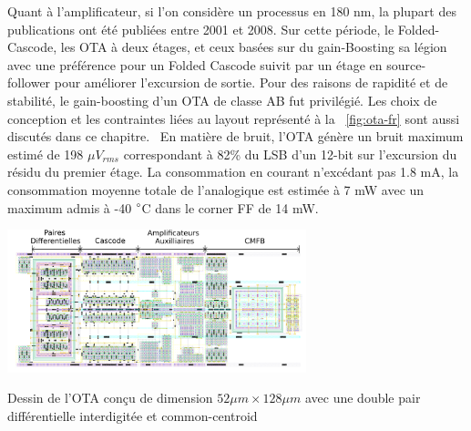\begin{mdframed}[linecolor=Prune,linewidth=1]
Quant à l'amplificateur, si l'on considère un processus en 180 nm, la plupart des publications ont été publiées entre 2001 et 2008. Sur cette période, le Folded-Cascode, les OTA à deux étages, et ceux basées sur du gain-Boosting sa légion avec une préférence pour un Folded Cascode suivit par un étage en source-follower pour améliorer l'excursion de sortie. Pour des raisons de rapidité et de stabilité, le gain-boosting d'un OTA de classe AB fut privilégié. Les choix de conception et les contraintes liées au layout représenté à la \figurename~\ref{fig:ota-fr} sont aussi discutés dans ce chapitre.  En matière de bruit, l'OTA génère un bruit maximum estimé de 198 \(\mu V _{rms} \) correspondant à 82\% du LSB d'un 12-bit sur l'excursion du résidu du premier étage. La consommation en courant n'excédant pas 1.8 mA, la consommation moyenne totale de l'analogique est estimée à 7 mW avec un maximum admis à -40 $\degree$C dans le corner FF de 14 mW.

\begin{center}
    \centering
    \includegraphics[width=0.65\textwidth]{Chapter7/Figs/layout_ota_v2-fr.png}
    \caption[]{Dessin de l'OTA conçu de dimension \(52 \mu m \times 128 \mu m\) avec une double pair différentielle interdigitée et common-centroid}
    \label{fig:ota-fr}
\end{center}


\end{mdframed}
